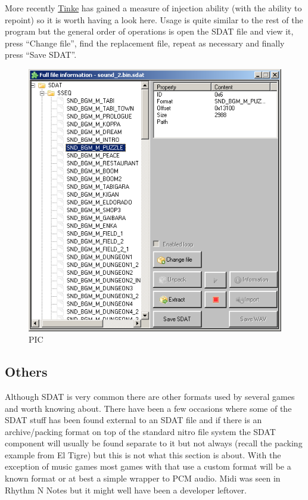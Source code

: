 \documentclass[
]{book}
\begin{document}
More recently \href{https://github.com/pleonex/tinke}{Tinke} has gained a measure of injection ability (with the ability to repoint) so it is worth having a look here. Usage is quite similar to the rest of the program but the general order of operations is open the SDAT file and view it, press ``Change file'', find the replacement file, repeat as necessary and finally press ``Save SDAT''.

\begin{figure}
\centering
\includegraphics{images/138_home_fast6191_romhackingguide_unrenamed_fil____borders_romhackguidesoundtinkereplacement1.png}
\caption{PIC}
\end{figure}

\hypertarget{others}{%
\subsection{Others}\label{others}}

Although SDAT is very common there are other formats used by several games and worth knowing about. There have been a few occasions where some of the SDAT stuff has been found external to an SDAT file and if there is an archive/packing format on top of the standard nitro file system the SDAT component will usually be found separate to it but not always (recall the packing example from El Tigre) but this is not what this section is about. With the exception of music games most games with that use a custom format will be a known format or at best a simple wrapper to PCM audio. Midi was seen in Rhythm N Notes but it might well have been a developer leftover.
\end{document}
